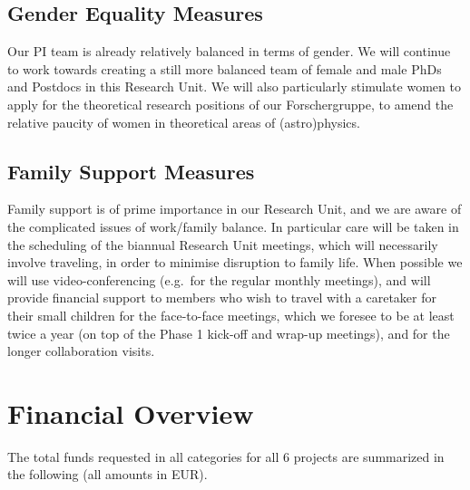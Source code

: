 \documentclass[10pt,fleqn,twoside]{article}
\begin{document}
\subsection{Gender Equality Measures}

Our PI team is already relatively balanced in terms of gender. We will
continue to work towards creating a still
more balanced team of female and male PhDs and Postdocs in this
Research Unit. We will also particularly stimulate women to apply for the theoretical research positions of our Forschergruppe, to amend the relative paucity of women in theoretical areas of (astro)physics.

\subsection{Family Support Measures}

Family support is of prime importance in our Research Unit, and we are
aware of the complicated issues of work/family balance. In particular
care will be taken in the scheduling of the biannual Research Unit
meetings, which will necessarily involve traveling, in order to
minimise disruption to family life. When possible we will use
video-conferencing (e.g.\ for the regular monthly meetings), and will
provide financial support to members who wish to travel with a
caretaker for their small children
for the face-to-face meetings, which we foresee to be at
least twice a year (on top of the Phase 1 kick-off and wrap-up
meetings), and for the longer collaboration visits. 

\vfill
\pagebreak[4]


\section{Financial Overview}

The total funds requested in all categories for all 6 projects are
summarized in the following (all amounts in EUR).
%

\medskip
\end{document}

